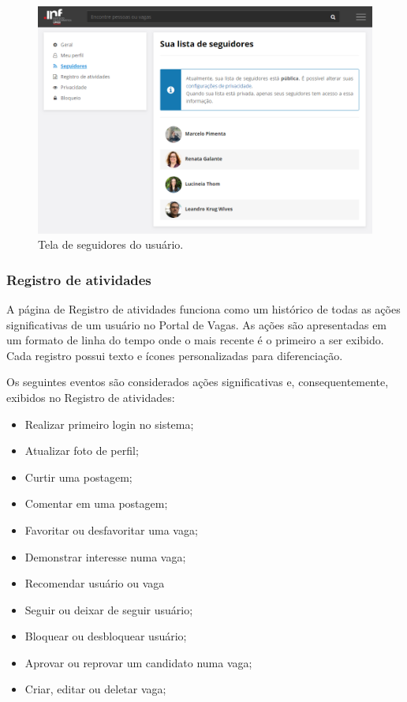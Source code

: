 \begin{figure}[ht]
    \caption{Tela de seguidores do usuário.}
       	\begin{center}
            \includegraphics[width=1\textwidth]{figuras/config_05.png}
        \end{center}
    \label{telaConfigSeguidores}
\end{figure}

\subsubsection{Registro de atividades}
\label{PDVFunConfiguracoesLog}

A página de Registro de atividades funciona como um histórico de todas as ações significativas de um usuário no Portal de Vagas. As ações são apresentadas em um formato de linha do tempo onde o mais recente é o primeiro a ser exibido. Cada registro possui texto e ícones personalizadas para diferenciação.

Os seguintes eventos são considerados ações significativas e, consequentemente, exibidos no Registro de atividades:

\begin{itemize}
    \item Realizar primeiro login no sistema;
    \item Atualizar foto de perfil;
    \item Curtir uma postagem;
    \item Comentar em uma postagem;
    \item Favoritar ou desfavoritar uma vaga;
    \item Demonstrar interesse numa vaga;
    \item Recomendar usuário ou vaga
    \item Seguir ou deixar de seguir usuário;
    \item Bloquear ou desbloquear usuário;
    \item Aprovar ou reprovar um candidato numa vaga;
    \item Criar, editar ou deletar vaga;
\end{itemize}

